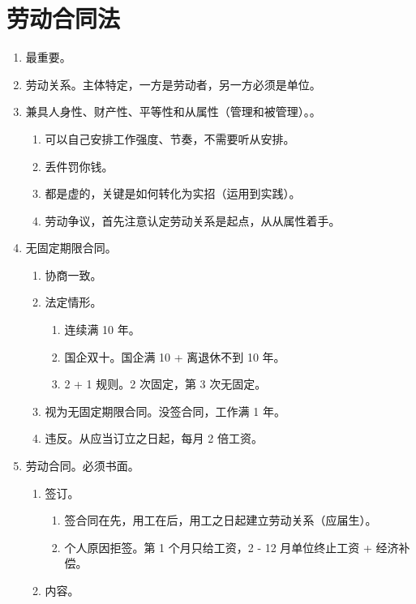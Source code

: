 \section{劳动合同法}
\begin{enumerate}
  \item 最重要。
  \item 劳动关系。主体特定，一方是劳动者，另一方必须是单位。
  \item 兼具人身性、财产性、平等性和从属性（管理和被管理）。。
        \begin{enumerate}
          \item 可以自己安排工作强度、节奏，不需要听从安排。
          \item 丢件罚你钱。
          \item 都是虚的，关键是如何转化为实招（运用到实践）。
          \item 劳动争议，首先注意认定劳动关系是起点，从从属性着手。
        \end{enumerate}
  \item 无固定期限合同。
        \begin{enumerate}
          \item 协商一致。
          \item 法定情形。
                \begin{enumerate}
                  \item 连续满 10 年。
                  \item 国企双十。国企满 10 + 离退休不到 10 年。
                  \item 2 + 1 规则。2 次固定，第 3 次无固定。
                \end{enumerate}
          \item 视为无固定期限合同。没签合同，工作满 1 年。
          \item 违反。从应当订立之日起，每月 2 倍工资。
        \end{enumerate}
  \item 劳动合同。必须书面。
        \begin{enumerate}
          \item 签订。
                \begin{enumerate}
                  \item 签合同在先，用工在后，用工之日起建立劳动关系（应届生）。
                  \item 个人原因拒签。第 1 个月只给工资，2 - 12 月单位终止工资 + 经济补偿。
                \end{enumerate}
          \item 内容。

\end{enumerate}
\end{enumerate}
